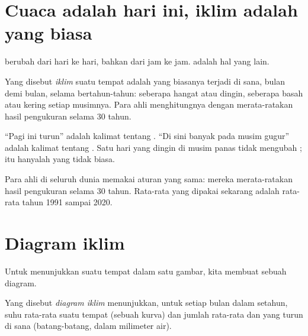 \section{Cuaca adalah hari ini, iklim adalah yang biasa}

 berubah dari hari ke hari, bahkan dari jam ke jam.  adalah hal
yang lain.

\begin{definition}[Iklim]\label{def:g5:weather-and-climate:climate}
Yang disebut \emph{iklim} suatu tempat adalah  yang
biasanya terjadi di sana, bulan demi bulan, selama bertahun-tahun: seberapa
hangat atau dingin, seberapa basah atau kering setiap musimnya. Para ahli
 menghitungnya dengan merata-ratakan hasil pengukuran selama 30 tahun.
\end{definition}

``Pagi ini  turun'' adalah kalimat tentang . ``Di sini banyak
 pada musim gugur'' adalah kalimat tentang . Satu hari yang
dingin di musim panas tidak mengubah ; itu hanyalah  yang tidak
biasa.

Para ahli  di seluruh dunia memakai aturan yang sama: mereka
merata-ratakan hasil pengukuran selama 30 tahun. Rata-rata yang dipakai
sekarang adalah rata-rata tahun 1991 sampai 2020.

\section{Diagram iklim}

Untuk menunjukkan  suatu tempat dalam satu gambar, kita membuat
sebuah diagram.

\begin{definition}\label{def:g5:weather-and-climate:climate-chart}
Yang disebut \emph{diagram iklim} menunjukkan, untuk
setiap bulan dalam setahun, suhu rata-rata suatu tempat (sebuah kurva) dan
jumlah rata-rata  dan  yang turun di sana (batang-batang, dalam
milimeter air).
\end{definition}


